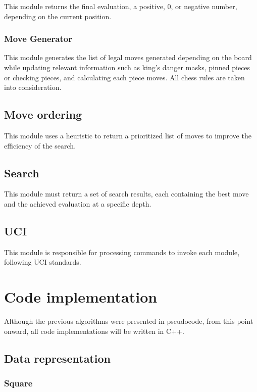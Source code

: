 This module returns the final evaluation, a positive, 0, or negative number, depending on the current position.

\subsubsection{Move Generator}

This module generates the list of legal moves generated depending on the board while updating relevant information such as king's danger masks, pinned pieces or checking pieces, and calculating each piece moves. All chess rules are taken into consideration.

\subsection{Move ordering}

This module uses a heuristic to return a prioritized list of moves to improve the efficiency of the search.

\subsection{Search}

This module must return a set of search results, each containing the best move and the achieved evaluation at a specific depth.

\subsection{UCI}

This module is responsible for processing commands to invoke each module, following UCI standards.

\section{Code implementation}
\label{sec:code}

Although the previous algorithms were presented in pseudocode, from this point onward, all code implementations will be written in C++.

\subsection{Data representation}

\subsubsection{Square}

